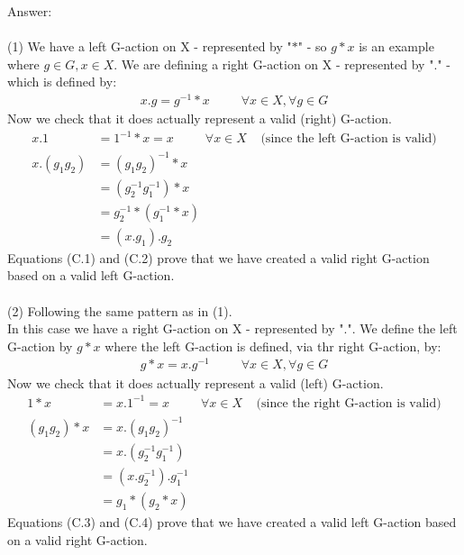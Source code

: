 \documentclass[12pt,a4paper]{article}
\begin{document}
\vspace{1cm}
\noindent
Answer:\\
\\
(1) We have a left G-action on X - represented by "$*$" - so $g*x$ is an example where $g \in G, x \in X$.
We are defining a right G-action on X - represented by "$.$" - which is defined by:
\begin{align*}
    x.g = g^{-1} * x \;\;\;\;\;\;\;\;\; \forall x \in X, \forall g \in G 
\end{align*}
Now we check that it does actually represent a valid (right) G-action.
\begin{align*}
    x.1 &= 1^{-1} * x = x \;\;\;\;\;\;\;\;\; \forall x \in X \;\;\;\; \text{(since the left G-action is valid)} \tag{C.1} \\
    x.(g_1g_2) &= (g_1g_2)^{-1}*x \\
    &= (g_2^{-1}g_1^{-1})*x \\
    &= g_2^{-1} * (g_1^{-1} * x) \\
    &= (x.g_1).g_2 \tag{C.2}
\end{align*}
Equations (C.1) and (C.2) prove that we have created a valid right G-action based on a valid left G-action.\\
\\
(2) Following the same pattern as in (1).\\
In this case we have a right G-action on X - represented by "$.$".  We define the left G-action by $g*x$ where the left G-action
is defined, via thr right G-action, by:
\begin{align*}
    g*x = x.g^{-1} \;\;\;\;\;\;\;\;\; \forall x \in X, \forall g \in G 
\end{align*}
Now we check that it does actually represent a valid (left) G-action.
\begin{align*}
    1 * x &= x . 1^{-1} = x \;\;\;\;\;\;\;\;\; \forall x \in X \;\;\;\; \text{(since the right G-action is valid)} \tag{C.3} \\
    (g_1g_2) * x &= x . (g_1 g_2)^{-1} \\
    &= x . (g_2^{-1}g_1^{-1}) \\
    &= (x . g_2^{-1}) . g_1^{-1} \\
    &= g_1 * (g_2 * x) \tag{C.4}
\end{align*}
Equations (C.3) and (C.4) prove that we have created a valid left G-action based on a valid right G-action.\\
\end{document}
